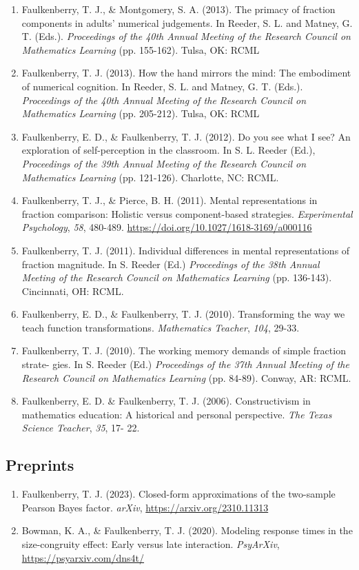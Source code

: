 \documentclass[article,10pt]{article}
\begin{document}
\begin{enumerate}
\item Faulkenberry, T. J., \& Montgomery, S. A. (2013). The primacy of fraction components in adults’ numerical judgements. In Reeder, S. L. and Matney, G. T. (Eds.). \emph{Proceedings of the 40th Annual Meeting of the Research Council on Mathematics Learning} (pp. 155-162). Tulsa, OK: RCML
\item Faulkenberry, T. J. (2013). How the hand mirrors the mind: The embodiment of numerical cognition. In Reeder, S. L. and Matney, G. T. (Eds.). \emph{Proceedings of the 40th Annual Meeting of the Research Council on Mathematics Learning} (pp. 205-212). Tulsa, OK: RCML
\item Faulkenberry, E. D., \& Faulkenberry, T. J. (2012). Do you see what I see? An exploration of self-perception in the classroom. In S. L. Reeder (Ed.), \emph{Proceedings of the 39th Annual Meeting of the Research Council on Mathematics Learning} (pp. 121-126). Charlotte, NC: RCML.
\item Faulkenberry, T. J., \& Pierce, B. H. (2011). Mental representations in fraction comparison: Holistic versus component-based strategies. \emph{Experimental Psychology}, \emph{58}, 480-489. \url{https://doi.org/}\href{http://dx.doi.org/10.1027/1618-3169/a000116}{10.1027/1618-3169/a000116}
\item Faulkenberry, T. J. (2011). Individual differences in mental representations of fraction magnitude. In S. Reeder (Ed.) \emph{Proceedings of the 38th Annual Meeting of the Research Council on Mathematics Learning} (pp. 136-143). Cincinnati, OH: RCML.
\item Faulkenberry, E. D., \& Faulkenberry, T. J. (2010). Transforming the way we teach function transformations. \emph{Mathematics Teacher}, \emph{104}, 29-33.
\item Faulkenberry, T. J. (2010). The working memory demands of simple fraction strate- gies. In S. Reeder (Ed.) \emph{Proceedings of the 37th Annual Meeting of the Research Council on Mathematics Learning} (pp. 84-89). Conway, AR: RCML.
\item Faulkenberry, E. D. \& Faulkenberry, T. J. (2006). Constructivism in mathematics education: A historical and personal perspective. \emph{The Texas Science Teacher}, \emph{35}, 17- 22.
\end{enumerate}

\subsection*{Preprints}
\label{sec:orge352416}
\begin{enumerate}
\item Faulkenberry, T. J. (2023). Closed-form approximations of the two-sample Pearson Bayes factor. \emph{arXiv}, \url{https://arxiv.org/2310.11313}
\item Bowman, K. A., \& Faulkenberry, T. J. (2020). Modeling response times in the size-congruity effect: Early versus late interaction. \emph{PsyArXiv}, \url{https://psyarxiv.com/dns4t/}
\end{enumerate}
\end{document}
